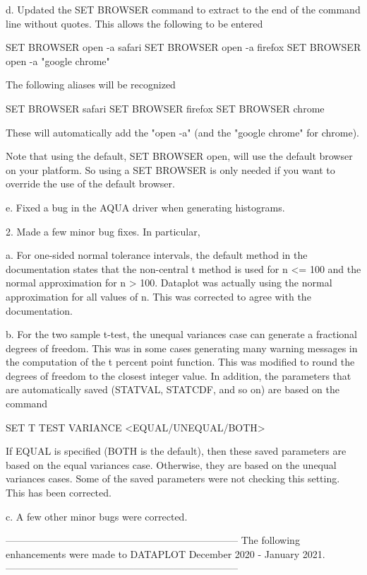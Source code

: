     d. Updated the SET BROWSER command to extract to the end of the
       command line without quotes.  This allows the following to be
       entered

           SET BROWSER open -a safari
           SET BROWSER open -a firefox
           SET BROWSER open -a "google chrome"

       The following aliases will be recognized

           SET BROWSER safari
           SET BROWSER firefox
           SET BROWSER chrome

       These will automatically add the "open -a" (and the
       "google chrome" for chrome).

       Note that using the default, SET BROWSER open, will use the
       default browser on your platform.  So using a SET BROWSER is
       only needed if you want to override the use of the default
       browser.

    e. Fixed a bug in the AQUA driver when generating histograms.

 2. Made a few minor bug fixes.  In particular,

    a. For one-sided normal tolerance intervals, the default method
       in the documentation states that the non-central t method is
       used for n <= 100 and the normal approximation for n > 100.
       Dataplot was actually using the normal approximation for all
       values of n.  This was corrected to agree with the documentation.

    b. For the two sample t-test, the unequal variances case can
       generate a fractional degrees of freedom.  This was in some
       cases generating many warning messages in the computation of
       the t percent point function.  This was modified to round the
       degrees of freedom to the closest integer value.  In addition,
       the parameters that are automatically saved (STATVAL, STATCDF,
       and so on) are based on the command

           SET T TEST VARIANCE <EQUAL/UNEQUAL/BOTH>

       If EQUAL is specified (BOTH is the default), then these saved
       parameters are based on the equal variances case.  Otherwise,
       they are based on the unequal variances cases.  Some of the
       saved parameters were not checking this setting.  This has been
       corrected.

    c. A few other minor bugs were corrected.

-----------------------------------------------------------------------
The following enhancements were made to DATAPLOT
December 2020 - January 2021.
-----------------------------------------------------------------------

